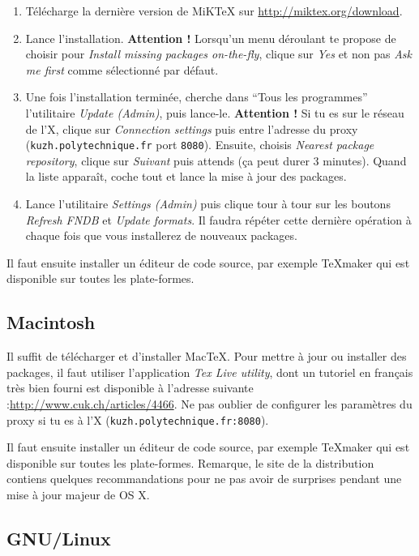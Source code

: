 \documentclass[a4paper,12pt,twoside]{article}
\begin{document}
\begin{enumerate}
	\item Télécharge la dernière version de MiKTeX sur \url{http://miktex.org/download}.
	\item Lance l'installation. \textbf{Attention !} Lorsqu'un menu déroulant te propose de choisir pour \emph{Install missing packages on-the-fly}, clique sur \emph{Yes} et non pas \emph{Ask me first} comme sélectionné par défaut.
	\item Une fois l'installation terminée, cherche dans \enquote{Tous les programmes} l'utilitaire \emph{Update (Admin)}, puis lance-le. \textbf{Attention !} Si tu es sur le réseau de l'X, clique sur \emph{Connection settings} puis entre l'adresse du proxy (\texttt{kuzh.polytechnique.fr} port \texttt{8080}). Ensuite, choisis \emph{Nearest package repository}, clique sur \emph{Suivant} puis attends (ça peut durer 3 minutes). Quand la liste apparaît, coche tout et lance la mise à jour des packages.
	\item Lance l'utilitaire \emph{Settings (Admin)} puis clique tour à tour sur les boutons \emph{Refresh FNDB} et \emph{Update formats}. Il faudra répéter cette dernière opération à chaque fois que vous installerez de nouveaux packages.
\end{enumerate}

Il faut ensuite installer un éditeur de code source, par exemple TeXmaker qui est disponible sur toutes les plate-formes.

\subsection{Macintosh}

Il suffit de télécharger et d'installer MacTeX. Pour mettre à jour ou installer des packages, il faut utiliser l'application \emph{Tex Live utility}, dont un tutoriel en français très bien fourni est disponible à l'adresse suivante :\url{http://www.cuk.ch/articles/4466}. Ne pas oublier de configurer les paramètres du proxy si tu es à l'X (\texttt{kuzh.polytechnique.fr:8080}).

Il faut ensuite installer un éditeur de code source, par exemple TeXmaker qui est disponible sur toutes les plate-formes.
Remarque, le site de la distribution contiens quelques recommandations pour ne pas avoir de surprises pendant une mise à jour majeur de OS X.

\subsection{GNU/Linux}
\end{document}
